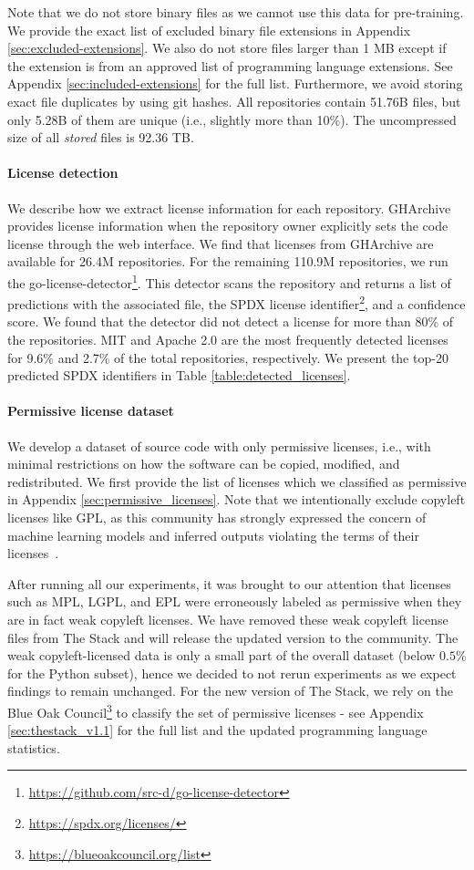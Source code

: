 Note that we do not store binary files as we cannot use this data for pre-training. We provide the exact list of excluded binary file extensions in Appendix \ref{sec:excluded-extensions}. We also do not store files larger than 1 MB except if the extension is from an approved list of programming language extensions. See Appendix \ref{sec:included-extensions} for the full list. Furthermore, we avoid storing exact file duplicates by using git hashes. All repositories contain 51.76B files, but only 5.28B of them are unique (i.e., slightly more than 10\%). The uncompressed size of all \emph{stored} files is 92.36 TB. 

\paragraph{License detection} We describe how we extract license information for each repository. GHArchive provides license information when the repository owner explicitly sets the code license through the web interface. We find that licenses from GHArchive are available for 26.4M repositories. For the remaining 110.9M repositories, we run the go-license-detector\footnote{\url{https://github.com/src-d/go-license-detector}}. This detector scans the repository and returns a list of predictions with the associated file, the SPDX license identifier\footnote{\url{https://spdx.org/licenses/}}, and a confidence score. We found that the detector did not detect a license for more than 80\% of the repositories. MIT and Apache 2.0 are the most frequently detected licenses for 9.6\% and 2.7\% of the total repositories, respectively. We present the top-20 predicted SPDX identifiers in Table \ref{table:detected_licenses}. 

\paragraph{Permissive license dataset} We develop a dataset of source code with only permissive licenses, i.e., with minimal restrictions on how the software can be copied, modified, and redistributed. We first provide the list of licenses which we classified as permissive in Appendix \ref{sec:permissive_licenses}. Note that we intentionally exclude copyleft licenses like GPL, as this community has strongly expressed the concern of machine learning models and inferred outputs violating the terms of their licenses~\cite{kuhn2022copilot}.  

After running all our experiments, it was brought to our attention that licenses such as MPL, LGPL, and EPL were erroneously labeled as permissive when they are in fact weak copyleft licenses. We have removed these weak copyleft license files from The Stack and will release the updated version to the community. The weak copyleft-licensed data is only a small part of the overall dataset (below $0.5$\% for the Python subset), hence we decided to not rerun experiments as we expect findings to remain unchanged. For the new version of The Stack, we rely on the Blue Oak Council\footnote{\url{https://blueoakcouncil.org/list}} to classify the set of permissive licenses - see Appendix \ref{sec:thestack_v1.1} for the full list and the updated programming language statistics. 

